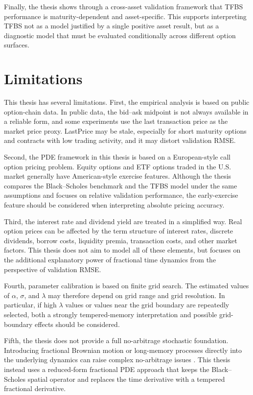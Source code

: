 \documentclass[11pt,a4paper]{report}
\begin{document}
Finally, the thesis shows through a cross-asset validation framework that TFBS performance is maturity-dependent and asset-specific. This supports interpreting TFBS not as a model justified by a single positive asset result, but as a diagnostic model that must be evaluated conditionally across different option surfaces.

\section{Limitations}

This thesis has several limitations. First, the empirical analysis is based on public option-chain data. In public data, the bid--ask midpoint is not always available in a reliable form, and some experiments use the last transaction price as the market price proxy. LastPrice may be stale, especially for short maturity options and contracts with low trading activity, and it may distort validation RMSE.

Second, the PDE framework in this thesis is based on a European-style call option pricing problem. Equity options and ETF options traded in the U.S. market generally have American-style exercise features. Although the thesis compares the Black--Scholes benchmark and the TFBS model under the same assumptions and focuses on relative validation performance, the early-exercise feature should be considered when interpreting absolute pricing accuracy.

Third, the interest rate and dividend yield are treated in a simplified way. Real option prices can be affected by the term structure of interest rates, discrete dividends, borrow costs, liquidity premia, transaction costs, and other market factors. This thesis does not aim to model all of these elements, but focuses on the additional explanatory power of fractional time dynamics from the perspective of validation RMSE.

Fourth, parameter calibration is based on finite grid search. The estimated values of $\alpha$, $\sigma$, and $\lambda$ may therefore depend on grid range and grid resolution. In particular, if high $\lambda$ values or values near the grid boundary are repeatedly selected, both a strongly tempered-memory interpretation and possible grid-boundary effects should be considered.

Fifth, the thesis does not provide a full no-arbitrage stochastic foundation. Introducing fractional Brownian motion or long-memory processes directly into the underlying dynamics can raise complex no-arbitrage issues \cite{Cheridito2003}. This thesis instead uses a reduced-form fractional PDE approach that keeps the Black--Scholes spatial operator and replaces the time derivative with a tempered fractional derivative.
\end{document}
